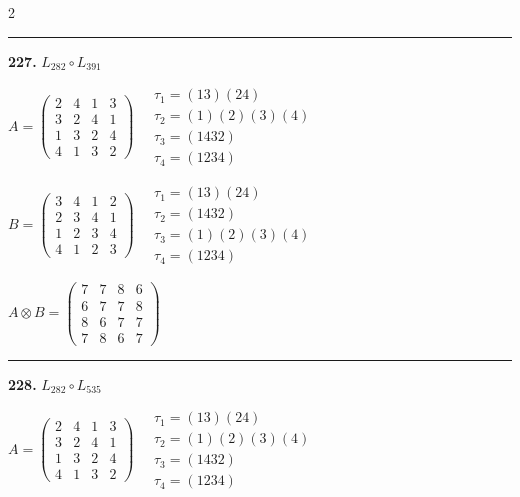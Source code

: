 \begin{multicols}{2}
\vspace{0.3em}
\hrule
\vspace{0.3em}

\noindent\textbf{227.} $L_{282} \circ L_{391}$

$A = \begin{pmatrix} 2 & 4 & 1 & 3 \\ 3 & 2 & 4 & 1 \\ 1 & 3 & 2 & 4 \\ 4 & 1 & 3 & 2 \end{pmatrix} \quad \begin{matrix} \tau_{1}=(1 3)(2 4) \\ \tau_{2}=(1)(2)(3)(4) \\ \tau_{3}=(1 4 3 2) \\ \tau_{4}=(1 2 3 4) \end{matrix}$

$B = \begin{pmatrix} 3 & 4 & 1 & 2 \\ 2 & 3 & 4 & 1 \\ 1 & 2 & 3 & 4 \\ 4 & 1 & 2 & 3 \end{pmatrix} \quad \begin{matrix} \tau_{1}=(1 3)(2 4) \\ \tau_{2}=(1 4 3 2) \\ \tau_{3}=(1)(2)(3)(4) \\ \tau_{4}=(1 2 3 4) \end{matrix}$

$A \otimes B = \begin{pmatrix} 7 & 7 & 8 & 6 \\ 6 & 7 & 7 & 8 \\ 8 & 6 & 7 & 7 \\ 7 & 8 & 6 & 7 \end{pmatrix}$

\vspace{0.3em}
\hrule
\vspace{0.3em}

\noindent\textbf{228.} $L_{282} \circ L_{535}$

$A = \begin{pmatrix} 2 & 4 & 1 & 3 \\ 3 & 2 & 4 & 1 \\ 1 & 3 & 2 & 4 \\ 4 & 1 & 3 & 2 \end{pmatrix} \quad \begin{matrix} \tau_{1}=(1 3)(2 4) \\ \tau_{2}=(1)(2)(3)(4) \\ \tau_{3}=(1 4 3 2) \\ \tau_{4}=(1 2 3 4) \end{matrix}$


\end{multicols}
